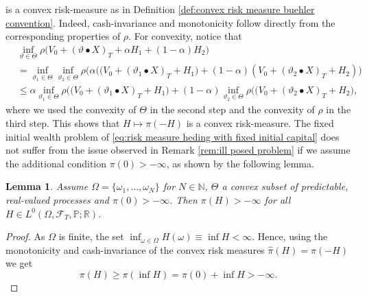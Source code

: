 \documentclass[11pt,a4paper,twoside,openany]{report}
\numberwithin{equation}{section}
\theoremstyle{plain} %
\newtheorem{lemma}[theorem]{Lemma}
\theoremstyle{definition} %
\theoremstyle{remark} %
\begin{document}
is a convex risk-measure as in Definition \ref{def:convex risk measure buehler convention}. Indeed, cash-invariance and monotonicity follow directly from the corresponding properties of \(\rho\). For convexity, notice that 
\begin{align*}
    &\inf_{\vartheta\in\Theta}\rho\big(V_0+(\vartheta\bullet X)_T+\alpha H_1+(1-\alpha) H_2\big)
    \\&=\inf_{\vartheta_1\in\Theta}\inf_{\vartheta_2\in\Theta}\rho\Big(\alpha\big((V_0+(\vartheta_1\bullet X)_T+H_1\big)+(1-\alpha) (V_0+(\vartheta_2\bullet X)_T+H_2)\Big)
    \\&\leq \alpha\inf_{\vartheta_1\in\Theta}\rho\big( (V_0+(\vartheta_1\bullet X)_T+H_1\big)+(1-\alpha)\inf_{\vartheta_2\in\Theta}\rho\big( (V_0+(\vartheta_2\bullet X)_T+H_2\big),
\end{align*}
 where we used the convexity of \(\Theta\) in the second step and the convexity of \(\rho\) in the third step. This shows that \(H\mapsto\pi(-H)\) is a convex risk-measure. The fixed initial wealth problem of \eqref{eq:risk measure heding with fixed initial capital} does not suffer from the issue observed in Remark \ref{rem:ill posed problem} if we assume the additional condition \(\pi(0)>-\infty\), as shown by the following lemma.


\begin{lemma}\label{lemma:Finiteness of inf for finite sample space}
    Assume \(\Omega = \{\omega_1,\dots,\omega_N\}\) for \(N\in\mathbb{N}\), \(\Theta\) a convex subset of predictable, real-valued processes and \(\pi(0)>-\infty\). Then \(\pi(H)>-\infty\) for all \(H\in L^0(\Omega,\mathcal{F}_T,\mathbb{P};\mathbb{R})\).
\end{lemma}
\begin{proof}
    As \(\Omega\) is finite, the set \(\inf_{\omega\in\Omega} H(\omega)\equiv\inf H<\infty\). Hence, using the monotonicity and cash-invariance of the convex risk measures \(\hat{\pi}(H)=\pi(-H)\) we get
    \begin{equation*}
        \pi(H)\geq\pi(\inf H)=\pi(0)+\inf H>-\infty.
    \end{equation*}
\end{proof}
\end{document}
